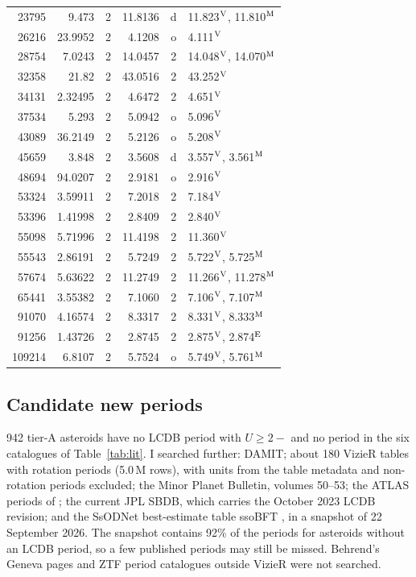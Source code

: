 \begin{table}
\begin{tabular}{rrcrcl}
23795 & 9.473 & 2 & 11.8136 & d & 11.823$^{\rm V}$, 11.810$^{\rm M}$ \\
26216 & 23.9952 & 2 & 4.1208 & o & 4.111$^{\rm V}$ \\
28754 & 7.0243 & 2 & 14.0457 & 2 & 14.048$^{\rm V}$, 14.070$^{\rm M}$ \\
32358 & 21.82 & 2 & 43.0516 & 2 & 43.252$^{\rm V}$ \\
34131 & 2.32495 & 2 & 4.6472 & 2 & 4.651$^{\rm V}$ \\
37534 & 5.293 & 2 & 5.0942 & o & 5.096$^{\rm V}$ \\
43089 & 36.2149 & 2 & 5.2126 & o & 5.208$^{\rm V}$ \\
45659 & 3.848 & 2 & 3.5608 & d & 3.557$^{\rm V}$, 3.561$^{\rm M}$ \\
48694 & 94.0207 & 2 & 2.9181 & o & 2.916$^{\rm V}$ \\
53324 & 3.59911 & 2 & 7.2018 & 2 & 7.184$^{\rm V}$ \\
53396 & 1.41998 & 2 & 2.8409 & 2 & 2.840$^{\rm V}$ \\
55098 & 5.71996 & 2 & 11.4198 & 2 & 11.360$^{\rm V}$ \\
55543 & 2.86191 & 2 & 5.7249 & 2 & 5.722$^{\rm V}$, 5.725$^{\rm M}$ \\
57674 & 5.63622 & 2 & 11.2749 & 2 & 11.266$^{\rm V}$, 11.278$^{\rm M}$ \\
65441 & 3.55382 & 2 & 7.1060 & 2 & 7.106$^{\rm V}$, 7.107$^{\rm M}$ \\
91070 & 4.16574 & 2 & 8.3317 & 2 & 8.331$^{\rm V}$, 8.333$^{\rm M}$ \\
91256 & 1.43726 & 2 & 2.8745 & 2 & 2.875$^{\rm V}$, 2.874$^{\rm E}$ \\
109214 & 6.8107 & 2 & 5.7524 & o & 5.749$^{\rm V}$, 5.761$^{\rm M}$ \\
\hline
\end{tabular}
\end{table}

\subsection{Candidate new periods}\label{sec:new}

942 tier-A asteroids have no LCDB period with $U\ge2-$ and no period in the six catalogues of
Table~\ref{tab:lit}. I searched further: DAMIT; about 180 VizieR tables with rotation periods (5.0\,M rows),
with units from the table metadata and non-rotation periods excluded; the Minor Planet Bulletin, volumes
50--53; the ATLAS periods of \citet{Durech2022}; the current JPL SBDB, which carries the October 2023 LCDB
revision; and the SsODNet best-estimate table ssoBFT \citep{Berthier2023}, in a snapshot of 22 September
2026. The snapshot contains 92\% of the \citet{Durech2022} periods for asteroids without an LCDB period, so
a few published periods may still be missed. Behrend's Geneva pages and ZTF period catalogues outside
VizieR were not searched.

